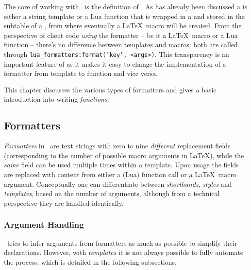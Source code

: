 \documentclass[12pt]{scrartcl}
\begin{document}
The core of working with \luaformatters\ is the definition of
.  As has already been discussed a 
is either a string template or a Lua function that is wrapped in a
 and stored in the  subtable of a
, from where eventually a \LaTeX\ macro will be created.
From the perspective of client code \emph{using} the formatter -- be it a
\LaTeX\ macro or a Lua function -- there's no difference between templates and
macros: both are called through \texttt{lua_formatters:format('key',
<args>)}.  This transparency is an important feature of \luaformatters
as it makes it easy to change the implementation of a formatter from template to
function and vice versa.

This chapter discusses the various types of formatters and gives a basic introduction into writing  \emph{functions}.


\subsection{Formatters}
\label{sec:templates}

\emph{Formatters} in \luaformatters\ are text strings with zero to nine
\emph{different} replacement fields (corresponding to the number of possible
macro arguments in \LaTeX), while the \emph{same} field can be used multiple
times within a template.  Upon usage the fields are replaced with content from
either a (Lua) function call or a \LaTeX\ macro argument.  Conceptually one can
differentiate between \emph{shorthands}, \emph{styles} and \emph{templates},
based on the number of arguments, although from a technical perspective they are
handled identically.


\subsubsection{Argument Handling}
\label{sec:templates-argument-handling}

\luaformatters\ tries to infer arguments from formatters as much as
possible to simplify their declarations.  However, with \emph{templates} it is
not always possible to fully automate the process, which is detailed in the
following subsections.
\end{document}
